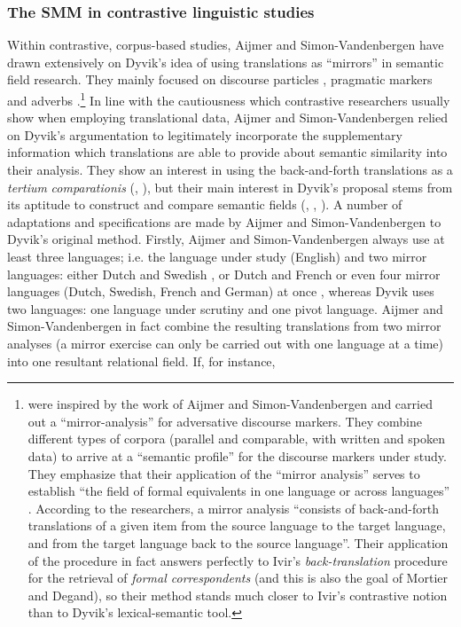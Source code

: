 \subsubsection{The SMM in contrastive linguistic studies}
\label{sec:2.3.4.4} 
Within contrastive, corpus-based studies, Aijmer and Simon-Vandenbergen have drawn extensively on Dyvik’s idea of using translations as “mirrors” in semantic field research. They mainly focused on discourse particles \citep{simon-vandenbergen_english_2013}, pragmatic markers \citep{simon-vandenbergen_expectation_2002,aijmer_model_2004,fischer_pragmatic_2006} and adverbs \citep{simon-vandenbergen_semantic_2007,simon-vandenbergen_english_2013}.\footnote{\citet{mortier_adversative_2009} were inspired by the work of Aijmer and Simon-Vandenbergen and carried out a “mirror-analysis” for adversative discourse markers. They combine different types of corpora (parallel and comparable, with written and spoken data) to arrive at a “semantic profile” for the discourse markers under study. They emphasize that their application of the “mirror analysis” serves to establish “the field of formal equivalents in one language or across languages” \citep[309]{mortier_adversative_2009}. According to the researchers, a mirror analysis “consists of back-and-forth translations of a given item from the source language to the target language, and from the target language back to the source language”. Their application of the procedure in fact answers perfectly to Ivir’s \textit{back-translation} procedure for the retrieval of \textit{formal correspondents} (and this is also the goal of Mortier and Degand), so their method stands much closer to Ivir’s contrastive notion than to Dyvik’s lexical-semantic tool.} In line with the cautiousness which contrastive researchers usually show when employing translational data, Aijmer and Simon-Vandenbergen relied on Dyvik’s argumentation to legitimately incorporate the supplementary information which translations are able to provide about semantic similarity into their analysis. They show an interest in using the back-and-forth translations as a \textit{tertium} \textit{comparationis} (\citealt[16]{simon-vandenbergen_expectation_2002}, \citealt[1795]{aijmer_model_2004}), but their main interest in Dyvik’s proposal stems from its aptitude to construct and compare semantic fields (\citealt[1131]{aijmer_discourse_2003}, \citealt[1782]{aijmer_model_2004}, \citealt[13]{simon-vandenbergen_expectation_2002}). A number of adaptations and specifications are made by Aijmer and Simon-Vandenbergen to Dyvik’s original method. Firstly, Aijmer and Simon-Vandenbergen always use at least three languages; i.e. the language under study (English) and two mirror languages: either Dutch and Swedish \citep{aijmer_model_2004}, or Dutch and French \citep{simon-vandenbergen_english_2013} or even four mirror languages (Dutch, Swedish, French and German) at once \citep{simon-vandenbergen_semantic_2007}, whereas Dyvik uses two languages: one language under scrutiny and one pivot language. Aijmer and Simon-Vandenbergen in fact combine the resulting translations from two mirror analyses (a mirror exercise can only be carried out with one language at a time) into one resultant relational field. If, for instance, 